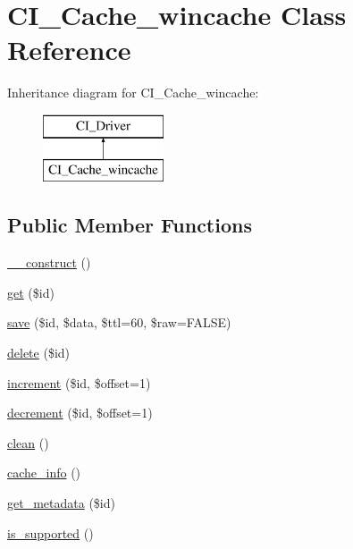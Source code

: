 \hypertarget{class_c_i___cache__wincache}{}\section{C\+I\+\_\+\+Cache\+\_\+wincache Class Reference}
\label{class_c_i___cache__wincache}
Inheritance diagram for C\+I\+\_\+\+Cache\+\_\+wincache\+:\begin{figure}[H]
\begin{center}
\leavevmode
\includegraphics[height=2.000000cm]{class_c_i___cache__wincache}
\end{center}
\end{figure}
\subsection*{Public Member Functions}
\begin{DoxyCompactItemize}
\item 
\mbox{\hyperlink{class_c_i___cache__wincache_abf1ed6f7d95ae8d31d31a00451f79b3c}{\+\_\+\+\_\+construct}} ()
\item 
\mbox{\hyperlink{class_c_i___cache__wincache_a167dd867cc9f9fad7b3b45371c9ce7f4}{get}} (\$id)
\item 
\mbox{\hyperlink{class_c_i___cache__wincache_af7ab63d42c2b10467235228816da8bc2}{save}} (\$id, \$data, \$ttl=60, \$raw=F\+A\+L\+SE)
\item 
\mbox{\hyperlink{class_c_i___cache__wincache_a6c501e7743de6350b7d9f9a74282b5d3}{delete}} (\$id)
\item 
\mbox{\hyperlink{class_c_i___cache__wincache_a0c6cb70aee456aab499eaf846818735d}{increment}} (\$id, \$offset=1)
\item 
\mbox{\hyperlink{class_c_i___cache__wincache_aa4e71d34016d96df4d0b8c833928dafe}{decrement}} (\$id, \$offset=1)
\item 
\mbox{\hyperlink{class_c_i___cache__wincache_a6e3ee9784ffc886a444b033868c0cbeb}{clean}} ()
\item 
\mbox{\hyperlink{class_c_i___cache__wincache_a22f6cbd9c6436a4c30b49c7d20fbf520}{cache\+\_\+info}} ()
\item 
\mbox{\hyperlink{class_c_i___cache__wincache_aaa61d1a457bd3db6009761ae059fce2b}{get\+\_\+metadata}} (\$id)
\item 
\mbox{\hyperlink{class_c_i___cache__wincache_ae40040edea23d47424580b3d51c7d070}{is\+\_\+supported}} ()
\end{DoxyCompactItemize}
